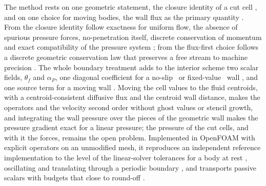 \documentclass[11pt,a4paper]{article}
\theoremstyle{remark}
\begin{document}
The method rests on one geometric statement, the closure identity of a cut cell%
, and on one choice for moving bodies, the wall flux as the primary quantity%
. From the closure identity follow exactness for uniform flow, the absence of spurious pressure
forces, no-penetration itself, discrete conservation of momentum and exact compatibility of
the pressure system%
; from the flux-first choice follows a discrete geometric conservation law that
preserves a free stream to machine precision%
. The whole boundary treatment adds to the interior scheme two scalar fields, $\theta_f$ and
$\alpha_P$, one diagonal coefficient for a no-slip%
\ or fixed-value%
\ wall%
, and one source term for a moving wall%
.
Moving the cell values to the fluid centroids, with a centroid-consistent diffusive flux and
the centroid wall distance, makes the operators and the velocity second order without ghost
values or stencil growth, and integrating the wall pressure over the pieces of the geometric
wall makes the pressure gradient exact for a linear pressure; the pressure of the cut cells,
and with it the forces, remains the open problem.
Implemented in OpenFOAM with explicit operators on an unmodified mesh, it reproduces an
independent reference implementation to the level of the linear-solver tolerances for a body
at rest%
, oscillating and translating through a periodic boundary%
, and transports passive scalars with budgets that close to round-off%
.
\end{document}
